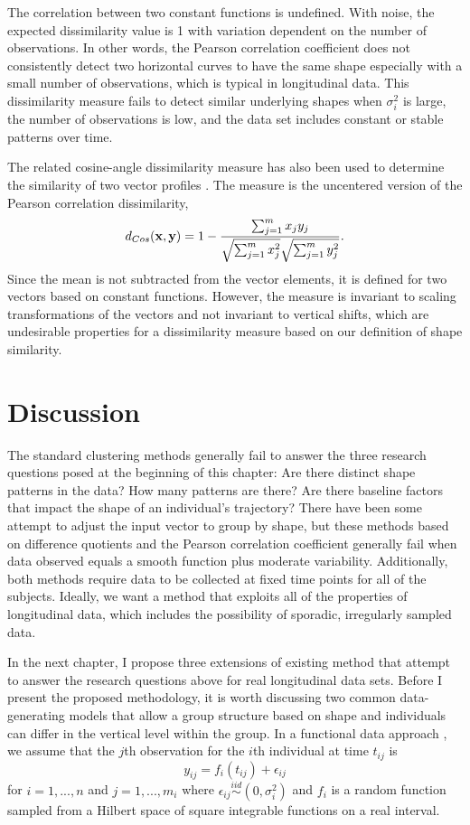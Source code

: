 The correlation between two constant functions is undefined. With noise, the expected dissimilarity value is 1 with variation dependent on the number of observations. In other words, the Pearson correlation coefficient does not consistently detect two horizontal curves to have the same shape especially with a small number of observations, which is typical in longitudinal data. This dissimilarity measure fails to detect similar underlying shapes when $\sigma_{i}^{2}$ is large, the number of observations is low, and the data set includes constant or stable patterns over time. 

The related cosine-angle dissimilarity measure has also been used to determine the similarity of two vector profiles \cite{eisen1998}. The measure is the uncentered version of the Pearson correlation dissimilarity,
$$d_{Cos}(\mathbf x,\mathbf y) = 1- \frac{\sum^{m}_{j=1}x_{j}y_{j}}{\sqrt{\sum^{m}_{j=1}x_{j}^{2}}\sqrt{\sum^{m}_{j=1}y_{j}^{2}}}.$$
Since the mean is not subtracted from the vector elements, it is defined for two vectors based on constant functions. However, the measure is invariant to scaling transformations of the vectors and not invariant to vertical shifts, which are undesirable properties for a dissimilarity measure based on our definition of shape similarity. 

\section{Discussion}
The standard clustering methods generally fail to answer the three research questions posed at the beginning of this chapter: Are there distinct shape patterns in the data? How many patterns are there? Are there baseline factors that impact the shape of an individual's trajectory? There have been some attempt to adjust the input vector to group by shape, but these methods based on difference quotients and the Pearson correlation coefficient generally fail when data observed equals a smooth function plus moderate variability. Additionally, both methods require data to be collected at fixed time points for all of the subjects. Ideally, we want a method that exploits all of the properties of longitudinal data, which includes the possibility of sporadic, irregularly sampled data.

In the next chapter, I propose three extensions of existing method that attempt to answer the research questions above for real longitudinal data sets. Before I present the proposed methodology, it is worth discussing two common data-generating models that allow a group structure based on shape and individuals can differ in the vertical level within the group. In a functional data approach \cite{ramsay2002}, we assume that the $j$th observation for the $i$th individual at time $t_{ij}$ is
$$y_{ij}= f_i(t_{ij})+\epsilon_{ij}$$
for $i=1,...,n$ and $j=1,...,m_{i}$ where $\epsilon_{ij}\overset{iid}{\sim} (0,\sigma_{i}^{2})$ and $f_{i}$ is a random function sampled from a Hilbert space of square integrable functions on a real interval. 

